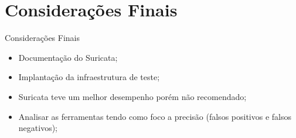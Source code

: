 \documentclass[aspectratio=169]{beamer}
\begin{document}
\section{Considerações Finais}
\begin{frame}{Considerações Finais}
    \begin{itemize}
        \item Documentação do Suricata;
        \item Implantação da infraestrutura de teste;
        \item Suricata teve um melhor desempenho porém não recomendado;
        \item Analisar as ferramentas tendo como foco a precisão (falsos positivos e falsos negativos);
    \end{itemize}
\end{frame}
\end{document}
